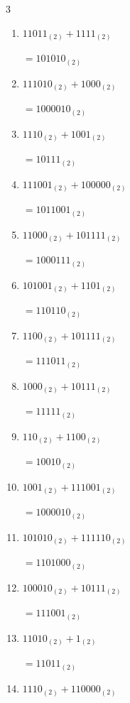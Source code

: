 \begin{multicols}{3}
\begin{enumerate}
        $=110010_{(2)}$

  \item $11011_{(2)} + 1111_{(2)}$

        $=101010_{(2)}$

  \item $111010_{(2)} + 1000_{(2)}$

        $=1000010_{(2)}$

  \item $1110_{(2)} + 1001_{(2)}$

        $=10111_{(2)}$

  \item $111001_{(2)} + 100000_{(2)}$

        $=1011001_{(2)}$

  \item $11000_{(2)} + 101111_{(2)}$

        $=1000111_{(2)}$

\columnbreak %

  \item $101001_{(2)} + 1101_{(2)}$

        $=110110_{(2)}$

  \item $1100_{(2)} + 101111_{(2)}$

        $=111011_{(2)}$

  \item $1000_{(2)} + 10111_{(2)}$

        $=11111_{(2)}$

  \item $110_{(2)} + 1100_{(2)}$

        $=10010_{(2)}$

  \item $1001_{(2)} + 111001_{(2)}$

        $=1000010_{(2)}$

  \item $101010_{(2)} + 111110_{(2)}$

        $=1101000_{(2)}$

  \item $100010_{(2)} + 10111_{(2)}$

        $=111001_{(2)}$

  \item $11010_{(2)} + 1_{(2)}$

        $=11011_{(2)}$

  \item $1110_{(2)} + 110000_{(2)}$


\end{enumerate}
\end{multicols}
